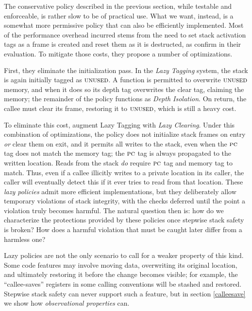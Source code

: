 \documentclass[acmsmall,review,anonymous]{acmart}\settopmatter{printfolios=true,printccs=false,printacmref=false}
\begin{document}
{The conservative policy described in the previous section, while
testable and enforceable, is rather slow to be of practical use. What
we want, instead, is a somewhat more permissive policy that can also
be efficiently implemented. Most of the performance overhead incurred
stems from the need to set stack activation tags as a frame is created
and reset them as it is destructed, as
\citet{DBLP:conf/sp/RoesslerD18} confirm in their evaluation. To
mitigate those costs, they propose a number of optimizations.

First, they eliminate the initialization pass. In the {\em Lazy Tagging}
system, the stack is again initially tagged as \(\textsc{unused}\).
A function is permitted
to overwrite \(\textsc{unused}\) memory, and when it does so its depth tag overwrites
the clear tag, claiming the memory; the remainder of the policy functions
as {\em Depth Isolation}. On return, the callee must clear its frame, restoring
it to \(\textsc{unused}\), which is still a heavy cost.

To eliminate this cost, \citet{DBLP:conf/sp/RoesslerD18} augment Lazy Tagging
with {\em Lazy Clearing}. Under this combination of optimizations,
the policy does not initialize stack frames on entry \emph{or} clear them on exit,
and it permits all writes to the stack, even when the $\textsc{pc}$ tag
does not match the memory tag; the \(\textsc{pc}\) tag is always propagated
to the written location. Reads from the stack \emph{do} require $\textsc{pc}$
tag and memory tag to match. Thus, even if a callee illicitly writes to
a private location in its caller, the caller will eventually detect this
if it ever tries to read from that location.
%
These \emph{lazy policies} admit more efficient implementations, but
they deliberately allow temporary violations of stack integrity,
with the checks deferred until the point a violation truly becomes
harmful. The natural question then is: how do we characterize the
protections provided by these policies once stepwise stack safety is broken?
How does a harmful violation that must be caught later differ from a
harmless one?

Lazy policies are not the only scenario to call for a weaker property of this kind.
Some code features may involve moving data, overwriting its original location,
and ultimately restoring it before the change becomes visible; for example, the
``callee-saves'' registers in some calling conventions will be stashed and restored.
Stepwise stack safety can never support such a feature, but in section \ref{calleesave}
we show how {\em observational properties} can.

}
\end{document}
